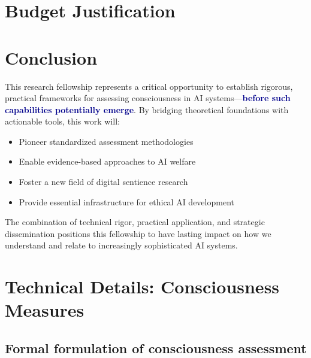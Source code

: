 \documentclass[11pt,a4paper]{article}
\newcommand{\impact}[1]{\textbf{\textcolor{darkblue}{#1}}}
\begin{document}
\section{Budget Justification}
\label{sec:budget}

\section{Conclusion}
\label{sec:conclusion}

This research fellowship represents a critical opportunity to establish rigorous, practical frameworks for assessing consciousness in AI systems—\impact{before such capabilities potentially emerge}. By bridging theoretical foundations with actionable tools, this work will:

\begin{itemize}
    \item Pioneer standardized assessment methodologies
    \item Enable evidence-based approaches to AI welfare
    \item Foster a new field of digital sentience research
    \item Provide essential infrastructure for ethical AI development
\end{itemize}

The combination of technical rigor, practical application, and strategic dissemination positions this fellowship to have lasting impact on how we understand and relate to increasingly sophisticated AI systems.




\appendix

\section{Technical Details: Consciousness Measures}

\subsection{Formal formulation of consciousness assessment}
\end{document}
